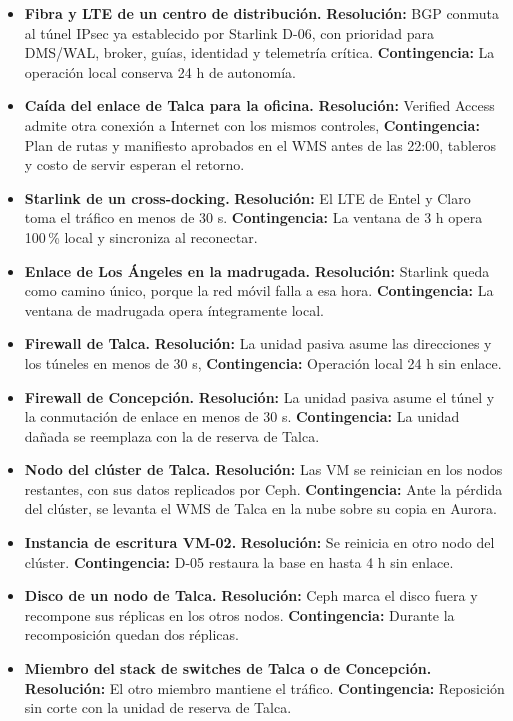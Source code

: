 \label{tab:fallas-sitios}
\begin{itemize}
\item \textbf{Fibra y LTE de un centro de distribución.} \textbf{Resolución:} BGP conmuta al túnel IPsec ya establecido por Starlink D-06, con prioridad para DMS/WAL, broker, guías, identidad y telemetría crítica. \textbf{Contingencia:} La operación local conserva 24 h de autonomía.
\item \textbf{Caída del enlace de Talca para la oficina.} \textbf{Resolución:} Verified Access admite otra conexión a Internet con los mismos controles, \textbf{Contingencia:} Plan de rutas y manifiesto aprobados en el WMS antes de las 22:00, tableros y costo de servir esperan el retorno.
\item \textbf{Starlink de un cross-docking.} \textbf{Resolución:} El LTE de Entel y Claro toma el tráfico en menos de 30 s. \textbf{Contingencia:} La ventana de 3 h opera 100\,\% local y sincroniza al reconectar.
\item \textbf{Enlace de Los Ángeles en la madrugada.} \textbf{Resolución:} Starlink queda como camino único, porque la red móvil falla a esa hora. \textbf{Contingencia:} La ventana de madrugada opera íntegramente local.
\item \textbf{Firewall de Talca.} \textbf{Resolución:} La unidad pasiva asume las direcciones y los túneles en menos de 30 s, \textbf{Contingencia:} Operación local 24 h sin enlace.
\item \textbf{Firewall de Concepción.} \textbf{Resolución:} La unidad pasiva asume el túnel y la conmutación de enlace en menos de 30 s. \textbf{Contingencia:} La unidad dañada se reemplaza con la de reserva de Talca.
\item \textbf{Nodo del clúster de Talca.} \textbf{Resolución:} Las VM se reinician en los nodos restantes, con sus datos replicados por Ceph. \textbf{Contingencia:} Ante la pérdida del clúster, se levanta el WMS de Talca en la nube sobre su copia en Aurora.
\item \textbf{Instancia de escritura VM-02.} \textbf{Resolución:} Se reinicia en otro nodo del clúster. \textbf{Contingencia:} D-05 restaura la base en hasta 4 h sin enlace.
\item \textbf{Disco de un nodo de Talca.} \textbf{Resolución:} Ceph marca el disco fuera y recompone sus réplicas en los otros nodos. \textbf{Contingencia:} Durante la recomposición quedan dos réplicas.
\item \textbf{Miembro del stack de switches de Talca o de Concepción.} \textbf{Resolución:} El otro miembro mantiene el tráfico. \textbf{Contingencia:} Reposición sin corte con la unidad de reserva de Talca.

\end{itemize}
